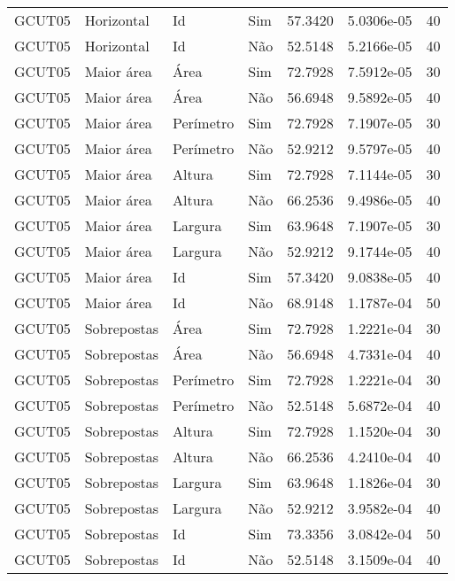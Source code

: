 \begin{tabular}{llllrrr}
    GCUT05    & Horizontal  & Id        & Sim         & 57.3420      & 5.0306e-05 & 40       \\
    GCUT05    & Horizontal  & Id        & Não         & 52.5148      & 5.2166e-05 & 40       \\
    GCUT05    & Maior área  & Área      & Sim         & 72.7928      & 7.5912e-05 & 30       \\
    GCUT05    & Maior área  & Área      & Não         & 56.6948      & 9.5892e-05 & 40       \\
    GCUT05    & Maior área  & Perímetro & Sim         & 72.7928      & 7.1907e-05 & 30       \\
    GCUT05    & Maior área  & Perímetro & Não         & 52.9212      & 9.5797e-05 & 40       \\
    GCUT05    & Maior área  & Altura    & Sim         & 72.7928      & 7.1144e-05 & 30       \\
    GCUT05    & Maior área  & Altura    & Não         & 66.2536      & 9.4986e-05 & 40       \\
    GCUT05    & Maior área  & Largura   & Sim         & 63.9648      & 7.1907e-05 & 30       \\
    GCUT05    & Maior área  & Largura   & Não         & 52.9212      & 9.1744e-05 & 40       \\
    GCUT05    & Maior área  & Id        & Sim         & 57.3420      & 9.0838e-05 & 40       \\
    GCUT05    & Maior área  & Id        & Não         & 68.9148      & 1.1787e-04 & 50       \\
    GCUT05    & Sobrepostas & Área      & Sim         & 72.7928      & 1.2221e-04 & 30       \\
    GCUT05    & Sobrepostas & Área      & Não         & 56.6948      & 4.7331e-04 & 40       \\
    GCUT05    & Sobrepostas & Perímetro & Sim         & 72.7928      & 1.2221e-04 & 30       \\
    GCUT05    & Sobrepostas & Perímetro & Não         & 52.5148      & 5.6872e-04 & 40       \\
    GCUT05    & Sobrepostas & Altura    & Sim         & 72.7928      & 1.1520e-04 & 30       \\
    GCUT05    & Sobrepostas & Altura    & Não         & 66.2536      & 4.2410e-04 & 40       \\
    GCUT05    & Sobrepostas & Largura   & Sim         & 63.9648      & 1.1826e-04 & 30       \\
    GCUT05    & Sobrepostas & Largura   & Não         & 52.9212      & 3.9582e-04 & 40       \\
    GCUT05    & Sobrepostas & Id        & Sim         & 73.3356      & 3.0842e-04 & 50       \\
    GCUT05    & Sobrepostas & Id        & Não         & 52.5148      & 3.1509e-04 & 40       \\
    \hline
\end{tabular}